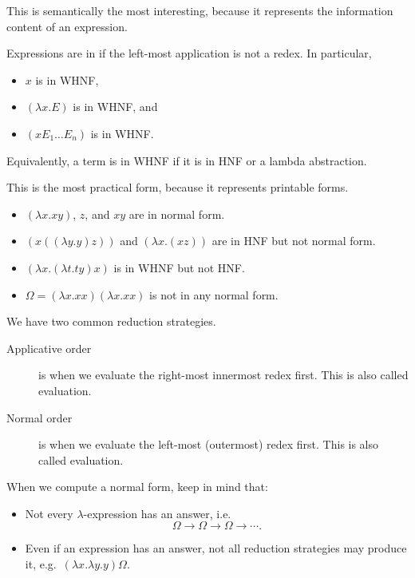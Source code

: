 \documentclass[class=scrartcl]{standalone}
\begin{document}
This is semantically the most interesting, because it represents
the information content of an expression.

\begin{definition}
  Expressions are in  if
  the left-most application is not a redex.
  In particular,
  \begin{itemize}[nosep]
    \item \(x\) is in WHNF,
    \item \((\lambda x. E)\) is in WHNF, and
    \item \((x E_1 \dots E_n)\) is in WHNF.\@
  \end{itemize}
  Equivalently, a term is in WHNF if it is in HNF or a lambda abstraction.
\end{definition}
This is the most practical form, because
it represents printable forms.

\begin{example}
  \begin{itemize}[nosep]
    \item \((\lambda x. x y)\), \(z\), and \(x y\) are in normal form.
    \item \((x ((\lambda y. y) z))\) and \((\lambda x. (x z))\)
          are in HNF but not normal form.
    \item \((\lambda x. (\lambda t. t y) x)\) is in WHNF but not HNF.\@
    \item \(\Omega = (\lambda x. x x)(\lambda x. x x)\)
          is not in any normal form.
  \end{itemize}
\end{example}

We have two common reduction strategies.
\begin{description}
  \item[Applicative order] is when we evaluate
        the right-most innermost redex first.
        This is also called  evaluation.
  \item[Normal order] is when we evaluate
        the left-most (outermost) redex first.
        This is also called  evaluation.
\end{description}

When we compute a normal form, keep in mind that:
\begin{itemize}
  \item Not every \(\lambda\)-expression has an answer, i.e.\
        \[
          \Omega \to \Omega \to \Omega \to \cdots.
        \]
  \item Even if an expression has an answer, not all reduction strategies
        may produce it, e.g.\ \((\lambda x. \lambda y. y) \Omega\).
\end{itemize}
\end{document}
